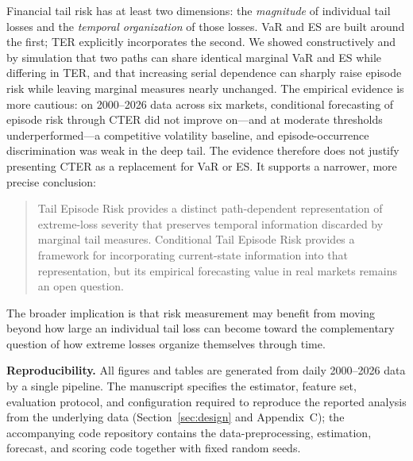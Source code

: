 \documentclass[11pt]{article}
\begin{document}
Financial tail risk has at least two dimensions: the \emph{magnitude} of individual tail losses and the
\emph{temporal organization} of those losses. VaR and ES are built around the first; TER explicitly
incorporates the second. We showed constructively and by simulation that two paths can share identical
marginal VaR and ES while differing in TER, and that increasing serial dependence can sharply raise episode
risk while leaving marginal measures nearly unchanged. The empirical evidence is more cautious: on
2000--2026 data across six markets, conditional forecasting of episode risk through CTER did not improve
on---and at moderate thresholds underperformed---a competitive volatility baseline, and episode-occurrence
discrimination was weak in the deep tail. The evidence therefore does not justify presenting CTER as a
replacement for VaR or ES. It supports a narrower, more precise conclusion:
\begin{quote}
Tail Episode Risk provides a distinct path-dependent representation of extreme-loss severity that preserves
temporal information discarded by marginal tail measures. Conditional Tail Episode Risk provides a framework
for incorporating current-state information into that representation, but its empirical forecasting value in
real markets remains an open question.
\end{quote}
The broader implication is that risk measurement may benefit from moving beyond how large an individual tail
loss can become toward the complementary question of how extreme losses organize themselves through time.

\bigskip
\noindent\textbf{Reproducibility.} All figures and tables are generated from daily 2000--2026 data by a
single pipeline. The manuscript specifies the estimator, feature set, evaluation protocol, and configuration
required to reproduce the reported analysis from the underlying data (Section~\ref{sec:design} and
Appendix~C); the accompanying code repository contains the data-preprocessing, estimation, forecast, and
scoring code together with fixed random seeds.
\end{document}
